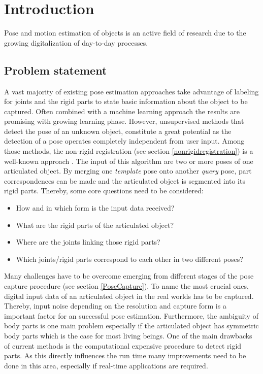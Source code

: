 \chapter{Introduction}
\label{cha:Introduction}

Pose and motion estimation of objects is an active field of research due to the growing digitalization of day-to-day processes. %

\section{Problem statement}
A vast majority of existing pose estimation approaches take advantage of labeling for joints and the rigid parts to state basic information about the object to be captured. Often combined with a machine learning approach the results are promising with growing learning phase. However, unsupervised methods that detect the pose of an unknown object, constitute a great potential as the detection of a pose operates completely independent from user input. Among those methods, the non-rigid registration (see section \ref{nonrigidregistration}) is a well-known approach \cite{survey}. The input of this algorithm are two or more poses of one articulated object. By merging one \textit{template} pose onto another \textit{query} pose, part correspondences can be made and the articulated object is segmented into its rigid parts. 
Thereby, some core questions need to be considered:
\\\begin{itemize}
	\item How and in which form is the input data received?
	\item What are the rigid parts of the articulated object?
	\item Where are the joints linking those rigid parts?
	\item Which joints/rigid parts correspond to each other in two different poses?
\end{itemize}
Many challenges have to be overcome emerging from different stages of the pose capture procedure (see section \ref{PoseCapture}). To name the most crucial ones, digital input data of an articulated object in the real worlds has to be captured. Thereby, input noise depending on the resolution and capture form is a important factor for an successful pose estimation. Furthermore, the ambiguity of body parts is one main problem especially if the articulated object has symmetric body parts which is the case for most living beings. One of the main drawbacks of current methods is the computational expensive procedure to detect rigid parts. As this directly influences the run time many improvements need to be done in this area, especially if real-time applications are required.

